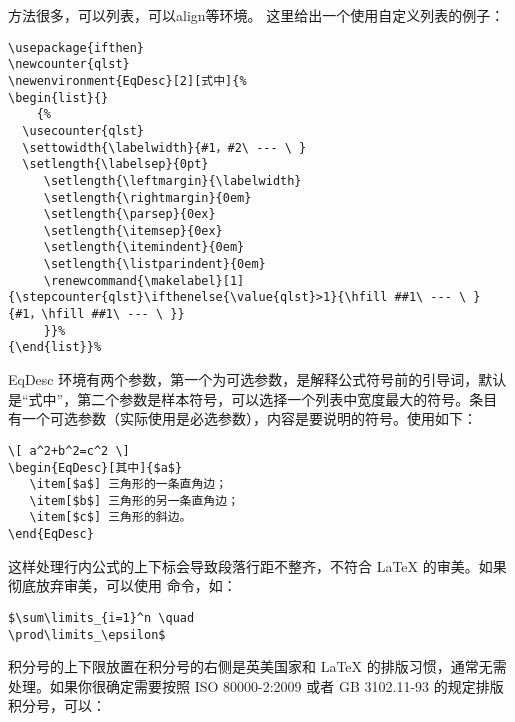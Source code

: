 
方法很多，可以列表，可以align等环境。 这里给出一个使用自定义列表的例子：

\begin{verbatim}
\usepackage{ifthen}
\newcounter{qlst}
\newenvironment{EqDesc}[2][式中]{%
\begin{list}{}
    {%
  \usecounter{qlst}
  \settowidth{\labelwidth}{#1，#2\ --- \ }
  \setlength{\labelsep}{0pt}
     \setlength{\leftmargin}{\labelwidth}
     \setlength{\rightmargin}{0em}
     \setlength{\parsep}{0ex}
     \setlength{\itemsep}{0ex}
     \setlength{\itemindent}{0em}
     \setlength{\listparindent}{0em}
     \renewcommand{\makelabel}[1]{\stepcounter{qlst}\ifthenelse{\value{qlst}>1}{\hfill ##1\ --- \ }{#1，\hfill ##1\ --- \ }}
     }}%
{\end{list}}%
\end{verbatim}

EqDesc
环境有两个参数，第一个为可选参数，是解释公式符号前的引导词，默认是``式中''，第二个参数是样本符号，可以选择一个列表中宽度最大的符号。条目  有一个可选参数（实际使用是必选参数），内容是要说明的符号。使用如下：

\begin{verbatim}
\[ a^2+b^2=c^2 \]
\begin{EqDesc}[其中]{$a$}
   \item[$a$] 三角形的一条直角边；
   \item[$b$] 三角形的另一条直角边；
   \item[$c$] 三角形的斜边。
\end{EqDesc}
\end{verbatim}



这样处理行内公式的上下标会导致段落行距不整齐，不符合 LaTeX
的审美。如果彻底放弃审美，可以使用  命令，如：

\begin{verbatim}
$\sum\limits_{i=1}^n \quad
\prod\limits_\epsilon$
\end{verbatim}



积分号的上下限放置在积分号的右侧是英美国家和 LaTeX
的排版习惯，通常无需处理。如果你很确定需要按照 ISO 80000-2:2009 或者 GB
3102.11-93 的规定排版积分号，可以：

